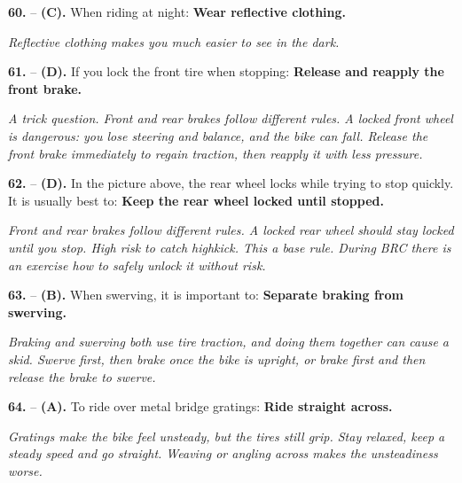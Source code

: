 \begin{minipage}{\linewidth}
\noindent\textbf{60.}  -- \textbf {(C).} When riding at night:  \textbf {Wear reflective clothing.} \par \textit {Reflective clothing makes you much easier to see in the dark.} \\
\end{minipage}

\begin{minipage}{\linewidth}
\noindent\textbf{61.}  -- \textbf {(D).} If you lock the front tire when stopping:  \textbf {Release and reapply the front brake.} \par \textit {A trick question. Front and rear brakes follow different rules. A locked front wheel is dangerous: you lose steering and balance, and the bike can fall. Release the front brake immediately to regain traction, then reapply it with less pressure.} \\
\end{minipage}

\begin{minipage}{\linewidth}
\noindent\textbf{62.}  -- \textbf {(D).} In the picture above, the rear wheel locks while trying to stop quickly. It is usually best to:  \textbf {Keep the rear wheel locked until stopped.} \par \textit {Front and rear brakes follow different rules. A locked rear wheel should stay locked until you stop. High risk to catch highkick. This a base rule. During BRC there is an exercise how to safely unlock it without risk.} \\
\end{minipage}

\begin{minipage}{\linewidth}
\noindent\textbf{63.}  -- \textbf {(B).} When swerving, it is important to:  \textbf {Separate braking from swerving.} \par \textit {Braking and swerving both use tire traction, and doing them together can cause a skid. Swerve first, then brake once the bike is upright, or brake first and then release the brake to swerve.} \\
\end{minipage}

\begin{minipage}{\linewidth}
\noindent\textbf{64.}  -- \textbf {(A).} To ride over metal bridge gratings:  \textbf {Ride straight across.} \par \textit {Gratings make the bike feel unsteady, but the tires still grip. Stay relaxed, keep a steady speed and go straight. Weaving or angling across makes the unsteadiness worse.} \\
\end{minipage}


